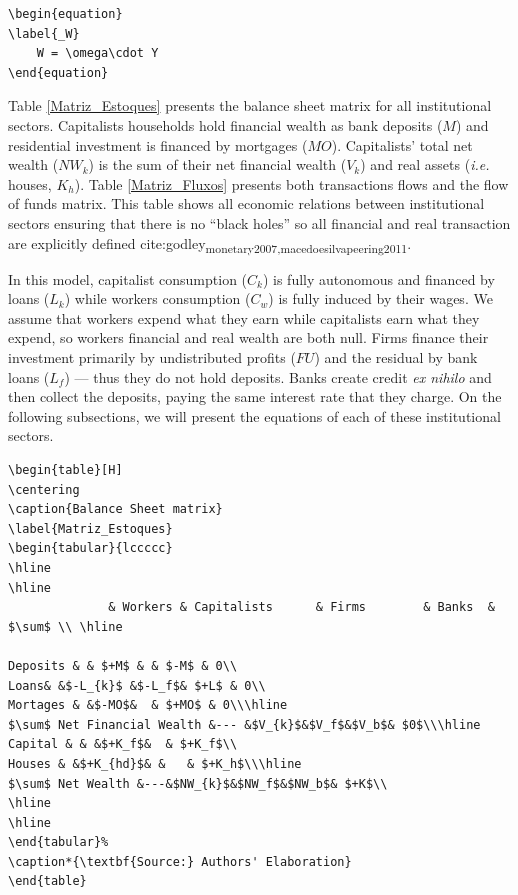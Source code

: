 \documentclass[12pt]{article}
\begin{document}
\begin{verbatim}
\begin{equation}
\label{_W}
    W = \omega\cdot Y
\end{equation}
\end{verbatim}

Table \ref{Matriz_Estoques} presents the balance sheet matrix for all institutional sectors. 
Capitalists households hold financial wealth as bank deposits (\(M\)) and residential investment is financed by mortgages (\(MO\)).
Capitalists' total net wealth (\(NW_{k}\)) is the sum of their net financial wealth (\(V_{k}\)) and real assets (\textit{i.e.} houses, \(K_h\)).
Table  \ref{Matriz_Fluxos} presents both transactions flows and the flow of funds matrix. 
This table shows all economic relations between institutional sectors ensuring that there is no  ``black holes''
so all financial and real transaction are explicitly defined cite:godley\textsubscript{monetary}\textsubscript{2007,macedo}\textsubscript{e}\textsubscript{silva}\textsubscript{peering}\textsubscript{2011}.

In this model, capitalist consumption (\(C_k\)) is fully autonomous and financed by loans (\(L_{k}\)) while workers consumption (\(C_w\)) is fully induced by their wages.
We assume that workers expend what they earn while capitalists earn what they expend, so workers financial and real wealth are both null.
Firms finance their investment primarily by undistributed profits (\(FU\)) and the residual by bank loans (\(L_f\)) --- thus they do not hold deposits. 
Banks create credit \textit{ex nihilo} and then collect the deposits, paying the same interest rate that they charge.
On the following subsections, we will present the equations of each of these institutional sectors.



\begin{verbatim}
\begin{table}[H]
\centering
\caption{Balance Sheet matrix}
\label{Matriz_Estoques}
\begin{tabular}{lccccc}
\hline
\hline
			  & Workers & Capitalists      & Firms        & Banks  &    $\sum$ \\ \hline

Deposits & & $+M$ & & $-M$ & 0\\
Loans& &$-L_{k}$ &$-L_f$& $+L$ & 0\\
Mortages & &$-MO$&  & $+MO$ & 0\\\hline
$\sum$ Net Financial Wealth &--- &$V_{k}$&$V_f$&$V_b$& $0$\\\hline
Capital & & &$+K_f$&  & $+K_f$\\
Houses & &$+K_{hd}$& &   & $+K_h$\\\hline
$\sum$ Net Wealth &---&$NW_{k}$&$NW_f$&$NW_b$& $+K$\\
\hline
\hline
\end{tabular}%
\caption*{\textbf{Source:} Authors' Elaboration}
\end{table}
\end{verbatim}
\end{document}
